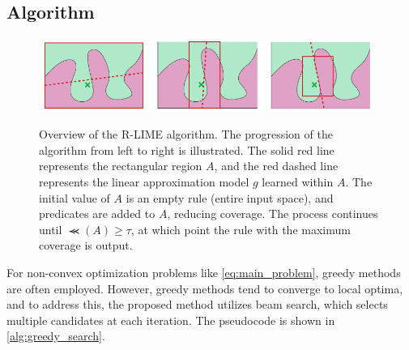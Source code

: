 \documentclass[runningheads]{llncs}
\begin{document}
\subsection{Algorithm}\label{sec:alg}
{%
  \begin{figure}[t]
    \centering
    \includegraphics[width=0.32\textwidth]{rlime1}
    \includegraphics[width=0.32\textwidth]{rlime2}
    \includegraphics[width=0.32\textwidth]{rlime3}
    \caption[Overview of the R-LIME Algorithm]{%
      Overview of the R-LIME algorithm. The progression of the algorithm from left to right is illustrated. The solid red line represents the rectangular region $A$, and the red dashed line represents the linear approximation model $g$ learned within $A$. The initial value of $A$ is an empty rule (entire input space), and predicates are added to $A$, reducing coverage. The process continues until $\Prec(A)\ge\tau$, at which point the rule with the maximum coverage is output.
    }
  \end{figure}
  \begin{algorithm}[p]
    
  \end{algorithm}
  \begin{algorithm}[p]
    
  \end{algorithm}
  \def\myidt{\hspace{\algorithmicindent}}
  \begin{algorithm}[p]
    
  \end{algorithm}
  \begin{algorithm}[p]
    
  \end{algorithm}
}
For non-convex optimization problems like \cref{eq:main_problem}, greedy methods are often employed. However, greedy methods tend to converge to local optima, and to address this, the proposed method utilizes beam search, which selects multiple candidates at each iteration. The pseudocode is shown in \cref{alg:greedy_search}.
\end{document}
